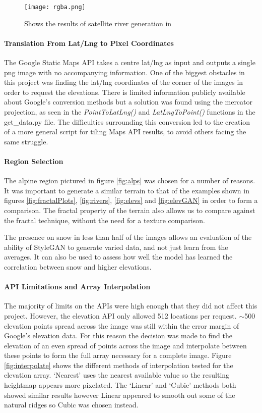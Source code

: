 \documentclass[a4paper]{report}
\begin{document}
\begin{figure}[H]
    \centering
        \texttt{[image: rgba.png]}
        \caption{Shows the results of satellite river generation in}
        \label{fig:rgba}
\end{figure}

\paragraph{Translation From Lat/Lng to Pixel Coordinates}
The Google Static Maps API takes a centre lat/lng as input and outputs a single png image with no accompanying information. One of the biggest obstacles in this project was finding the lat/lng coordinates of the corner of the images in order to request the elevations. There is limited information publicly available about Google's conversion methods but a solution was found using the mercator projection, as seen in the \textit{PointToLatLng()} and \textit{LatLngToPoint()} functions in the get\_data.py file.
The difficulties surrounding this conversion led to the creation of a more general script \cite{ToDo} for tiling Maps API results, to avoid others facing the same struggle.

\paragraph{Region Selection}
The alpine region pictured in figure \ref{fig:alps} was chosen for a number of reasons. It was important to generate a similar terrain to that of the examples shown in figures \ref{fig:fractalPlots}, \ref{fig:rivers}, \ref{fig:elevs} and \ref{fig:elevGAN} in order to form a comparison. The fractal property of the terrain also allows us to compare against the fractal technique, without the need for a texture comparison.

The presence on snow in less than half of the images allows an evaluation of the ability of StyleGAN to generate varied data, and not just learn from the averages. It can also be used to assess how well the model has learned the correlation between snow and higher elevations.

\paragraph{API Limitations and Array Interpolation}
The majority of limits on the APIs were high enough that they did not affect this project. However, the elevation API only allowed 512 locations per request. $\sim$500 elevation points spread across the image was still within the error margin of Google's elevation data. For this reason the decision was made to find the elevation of an even spread of points across the image and interpolate between these points to form the full array necessary for a complete image. Figure \ref{fig:interpolate} shows the different methods of interpolation tested for the elevation array. `Nearest' uses the nearest available value so the resulting heightmap appears more pixelated. The `Linear' and `Cubic' methods both showed similar results however Linear appeared to smooth out some of the natural ridges so Cubic was chosen instead.
\end{document}
